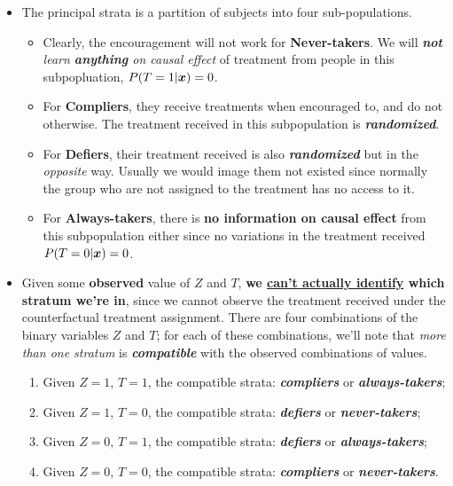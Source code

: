 \documentclass[11pt]{article}
\begin{document}
\begin{itemize}
\item The principal strata is a partition of subjects into four sub-populations. 
\begin{itemize}
\item Clearly, the encouragement will not work for \textbf{Never-takers}. We will \emph{\textbf{not} learn \textbf{anything} on causal effect} of treatment from people in this subpopluation, $P(T=1|\boldsymbol{x}) = 0$.
\item For \textbf{Compliers}, they receive treatments when encouraged to, and do not otherwise.  The treatment received in this subpopulation is \emph{\textbf{randomized}}.

\item For \textbf{Defiers},  their treatment received is  also \emph{\textbf{randomized}} but in the \emph{opposite} way. Usually we would image them not existed since normally the group who are not assigned to the treatment has no access to it.

\item For \textbf{Always-takers}, there is \textbf{no information on causal effect} from this subpopulation either since no variations in the treatment received $P(T=0|\boldsymbol{x}) = 0$.
\end{itemize} 

\item Given some \textbf{observed} value of $Z$ and $T$, \textbf{we \underline{can’t actually identify} which stratum we’re in}, since we cannot observe the treatment received under the counterfactual treatment assignment. There are four combinations of the binary variables $Z$ and $T$; for each of these combinations, we’ll note that \emph{more than one stratum} is \emph{\textbf{compatible}} with the observed combinations of values.
\begin{enumerate}
\item Given $Z=1$, $T=1$, the compatible strata: \textbf{\emph{compliers}} or \emph{\textbf{always-takers}};
\item Given $Z=1$, $T=0$, the compatible strata: \textbf{\emph{defiers}} or \textbf{\emph{never-takers}};
\item Given $Z=0$, $T=1$, the compatible strata: \textbf{\emph{defiers}} or \emph{\textbf{always-takers}};
\item Given $Z=0$, $T=0$, the compatible strata: \textbf{\emph{compliers}} or \emph{\textbf{never-takers}}.
\end{enumerate}
\end{itemize}
\end{document}
